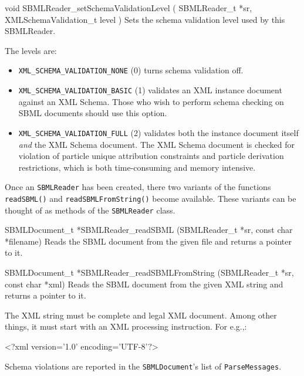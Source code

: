 \documentclass{cekmanual}
\begin{document}
\begin{methoddef}{void SBMLReader\_setSchemaValidationLevel ( SBMLReader\_t *sr,
XMLSchemaValidation\_t level )}
  Sets the schema validation level used by this SBMLReader.

  The levels are:
  \begin{itemize}
    \item \texttt{XML\_SCHEMA\_VALIDATION\_NONE} (0) turns schema
    validation off.

    \item \texttt{XML\_SCHEMA\_VALIDATION\_BASIC} (1) validates an XML
    instance document against an XML Schema.  Those who wish to
    perform schema checking on SBML documents should use this option.

    \item \texttt{XML\_SCHEMA\_VALIDATION\_FULL} (2) validates both
    the instance document itself \emph{and} the XML Schema document.
    The XML Schema document is checked for violation of particle
    unique attribution constraints and particle derivation
    restrictions, which is both time-consuming and memory intensive.
  \end{itemize}
\end{methoddef}


Once an \texttt{SBMLReader} has been created, there two variants of the
functions \texttt{readSBML()} and \texttt{readSBMLFromString()} become
available.  These variants can be thought of as methods of the
\texttt{SBMLReader} class.


\begin{methoddef}{SBMLDocument\_t *SBMLReader\_readSBML (SBMLReader\_t *sr,
const char *filename)}
  Reads the SBML document from the given file and returns a pointer to
  it.
\end{methoddef}

\begin{methoddef}{SBMLDocument\_t *SBMLReader\_readSBMLFromString (SBMLReader\_t *sr, const char *xml)}
  Reads the SBML document from the given XML string and returns a pointer
  to it.

  The XML string must be complete and legal XML document.  Among other
  things, it must start with an XML processing instruction.  For e.g.,:
  \begin{example}
    <?xml version='1.0' encoding='UTF-8'?>
  \end{example}
\end{methoddef}


Schema violations are reported in the \texttt{SBMLDocument}'s list of
\texttt{ParseMessages}.
\end{document}

